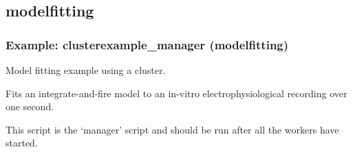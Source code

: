 \documentclass[letterpaper,10pt,english]{manual}
\begin{document}
\subsection{modelfitting}

\resetcurrentobjects
\hypertarget{--doc-examples-modelfitting_clusterexample_manager}{}

\hypertarget{index-75}{}\subsubsection{Example: clusterexample\_manager (modelfitting)}

Model fitting example using a cluster.

Fits an integrate-and-fire model to an in-vitro electrophysiological
recording over one second.

This script is the `manager' script and should be run after all the workers
have started.
\end{document}
